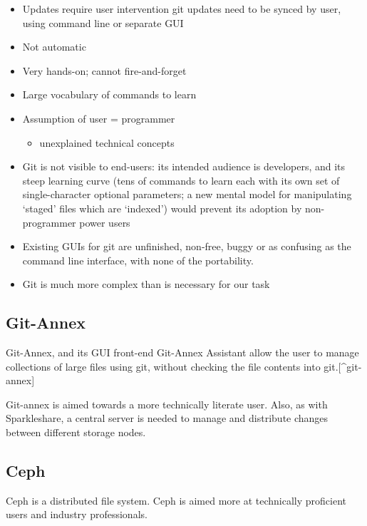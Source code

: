 \documentclass[12pt,a4paper,]{adreport}
\begin{document}
\begin{itemize}
\item
  Updates require user intervention git updates need to be synced by
  user, using command line or separate GUI
\item
  Not automatic
\item
  Very hands-on; cannot fire-and-forget
\item
  Large vocabulary of commands to learn
\item
  Assumption of user = programmer

  \begin{itemize}
  \itemsep1pt\parskip0pt
  \item
    unexplained technical concepts
  \end{itemize}
\item
  Git is not visible to end-users: its intended audience is developers,
  and its steep learning curve (tens of commands to learn each with its
  own set of single-character optional parameters; a new mental model
  for manipulating `staged' files which are `indexed') would prevent its
  adoption by non-programmer power users
\item
  Existing GUIs for git are unfinished, non-free, buggy or as confusing
  as the command line interface, with none of the portability.
\item
  Git is much more complex than is necessary for our task
\end{itemize}

\subsection{Git-Annex}\label{git-annex}

Git-Annex, and its GUI front-end Git-Annex Assistant allow the user to
manage collections of large files using git, without checking the file
contents into git.{[}\^{}git-annex{]}

Git-annex is aimed towards a more technically literate user. Also, as
with Sparkleshare, a central server is needed to manage and distribute
changes between different storage nodes.

\subsection{Ceph}\label{ceph}

Ceph is a distributed file system. Ceph is aimed more at technically
proficient users and industry professionals.
\end{document}
